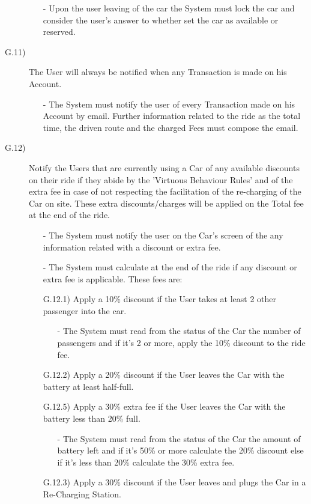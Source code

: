 \documentclass[a4paper]{article}
\begin{document}
\begin{description}
\begin{itemize}
	\item[-]Upon the user leaving of the car the System must lock the car and consider the user's answer to whether set the car as available or reserved.
\end{itemize}
\item [G.11)]The User will always be notified when any Transaction is made on his Account.
\begin{itemize}
	\item[-]The System must notify the user of every Transaction made on his Account by email. Further information related to the ride as the total time, the driven route and the charged Fees must compose the email.
\end{itemize}
\item [G.12)]Notify the Users that are currently using a Car of any available discounts on their ride if they abide by the 'Virtuous Behaviour Rules' and of the extra fee in case of not respecting the facilitation of the re-charging of the Car on site. These extra discounts/charges will be applied on the Total fee at the end of the ride.
\begin{itemize}
	\item[-]The System must notify the user on the Car's screen of the any information related with a discount or extra fee.
  	\item[-]The System must calculate at the end of the ride if any discount or extra fee is applicable. These fees are:
	\item [G.12.1)]Apply a 10\% discount if the User takes at least 2 other passenger into the car.
	\begin{itemize}
	\item[-]The System must read from the status of the Car the number of passengers and if it's 2 or more, apply the 10\% discount to the ride fee.
	\end{itemize}
	\item [G.12.2)]Apply a 20\% discount if the User leaves the Car with the battery at least half-full.
	\item [G.12.5)]Apply a 30\% extra fee if the User leaves the Car with the battery less than 20\% full.
	\begin{itemize}
	\item[-]The System must read from the status of the Car the amount of battery left and if it's 50\% or more calculate the 20\% discount else if it's less than 20\% calculate the 30\% extra fee.
	\end{itemize}
	\item [G.12.3)]Apply a 30\% discount if the User leaves and plugs the Car in a Re-Charging Station.

\end{itemize}
\end{description}
\end{document}
